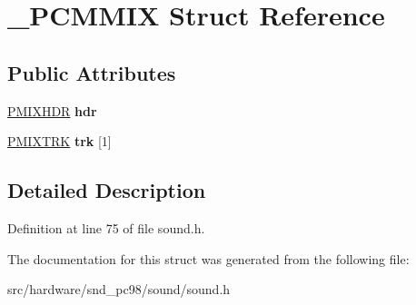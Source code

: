 \hypertarget{struct__PCMMIX}{\section{\-\_\-\-P\-C\-M\-M\-I\-X Struct Reference}
\label{struct__PCMMIX}
}
\subsection*{Public Attributes}
\begin{DoxyCompactItemize}
\item 
\hypertarget{struct__PCMMIX_a79455310cc3efe4775ea726025ed2f22}{\hyperlink{structPMIXHDR}{P\-M\-I\-X\-H\-D\-R} {\bfseries hdr}}\label{struct__PCMMIX_a79455310cc3efe4775ea726025ed2f22}

\item 
\hypertarget{struct__PCMMIX_ade057861097db5440cc4b1f14925a989}{\hyperlink{structPMIXTRK}{P\-M\-I\-X\-T\-R\-K} {\bfseries trk} \mbox{[}1\mbox{]}}\label{struct__PCMMIX_ade057861097db5440cc4b1f14925a989}

\end{DoxyCompactItemize}


\subsection{Detailed Description}


Definition at line 75 of file sound.\-h.



The documentation for this struct was generated from the following file\-:\begin{DoxyCompactItemize}
\item 
src/hardware/snd\-\_\-pc98/sound/sound.\-h\end{DoxyCompactItemize}
